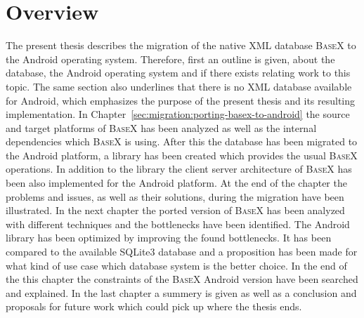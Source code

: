 \section{Overview}
\label{sec:overview}
The present thesis describes the migration of the native XML database \textsc{BaseX} to the Android operating system.
Therefore, first an outline is given, about the database, the Android operating system and if there exists relating work to this topic.
The same section also underlines that there is no XML database available for Android, which emphasizes the purpose of the present thesis and its resulting implementation.
In Chapter~\ref{sec:migration:porting-basex-to-android} the source and target platforms of \textsc{BaseX} has been analyzed as well as the internal dependencies which \textsc{BaseX} is using.
After this the database has been migrated to the Android platform, a library has been created which provides the usual \textsc{BaseX} operations.
In addition to the library the client server architecture of \textsc{BaseX} has been also implemented for the Android platform.
At the end of the chapter the problems and issues, as well as their solutions, during the migration have been illustrated.
In the next chapter the ported version of \textsc{BaseX} has been analyzed with different techniques and the bottlenecks have been identified.
The Android library has been optimized by improving the found bottlenecks.
It has been compared to the available SQLite3 database and a proposition has been made for what kind of use case which database system is the better choice.
In the end of the this chapter the constraints of the \textsc{BaseX} Android version have been searched and explained.
In the last chapter a summery is given as well as a conclusion and proposals for future work which could pick up where the thesis ends.



